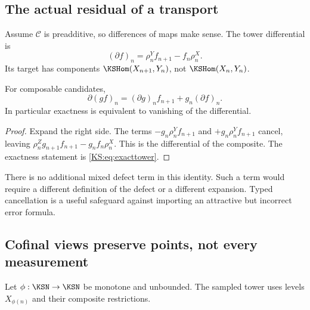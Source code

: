 \subsection{The actual residual of a transport}
Assume \(\mathcal C\) is preadditive, so differences of maps make sense. The tower differential is
\[
 (\partial f)_n=\rho^Y_nf_{n+1}-f_n\rho^X_n.
\]
Its target has components \(\KSHom(X_{n+1},Y_n)\), not \(\KSHom(X_n,Y_n)\).

\begin{KSproposition}\label{KS:KS17}
For composable candidates,
\[
 \partial(gf)_n=(\partial g)_nf_{n+1}+g_n(\partial f)_n.
\]
In particular exactness is equivalent to vanishing of the differential.
\end{KSproposition}
\begin{proof}
Expand the right side. The terms \(-g_n\rho^Y_nf_{n+1}\) and \(+g_n\rho^Y_nf_{n+1}\) cancel, leaving \(\rho^Z_ng_{n+1}f_{n+1}-g_nf_n\rho^X_n\). This is the differential of the composite. The exactness statement is \eqref{KS:eq:exacttower}.
\end{proof}
There is no additional mixed defect term in this identity. Such a term would require a different definition of the defect or a different expansion. Typed cancellation is a useful safeguard against importing an attractive but incorrect error formula.

\subsection{Cofinal views preserve points, not every measurement}
Let \(\phi:\KSN\to\KSN\) be monotone and unbounded. The sampled tower uses levels \(X_{\phi(n)}\) and their composite restrictions.

